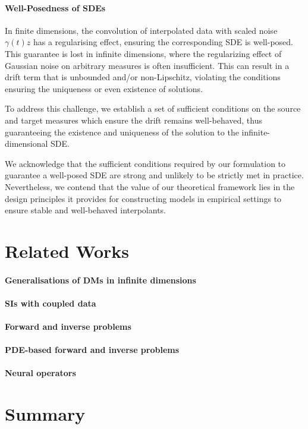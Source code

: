 \paragraph{Well-Posedness of SDEs} In finite dimensions, the convolution of interpolated data with scaled noise \(\gamma(t)z\) has a regularising effect, ensuring the corresponding SDE is well-posed. This guarantee is lost in infinite dimensions, where the regularizing effect of Gaussian noise on arbitrary measures is often insufficient. This can result in a drift term that is unbounded and/or non-Lipschitz, violating the conditions ensuring the uniqueness or even existence of solutions.

To address this challenge, we establish a set of sufficient conditions on the source and target measures which ensure the drift remains well-behaved, thus guaranteeing the existence and uniqueness of the solution to the infinite-dimensional SDE.

We acknowledge that the sufficient conditions required by our formulation to guarantee a well-posed SDE are strong and unlikely to be strictly met in practice. Nevertheless, we contend that the value of our theoretical framework lies in the design principles it provides for constructing models in empirical settings to ensure stable and well-behaved interpolants.

\section{Related Works}

\paragraph{Generalisations of DMs in infinite dimensions}

\paragraph{SIs with coupled data}
\paragraph{Forward and inverse problems}

\paragraph{PDE-based forward and inverse problems}

\paragraph{Neural operators}



\section{Summary}